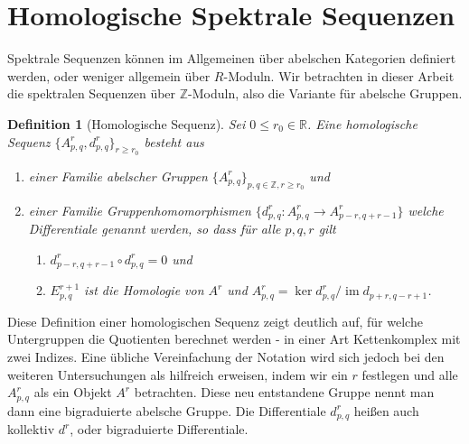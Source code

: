 \documentclass[12pt, hidelinks]{article}
\numberwithin{conj}{section}
\newtheorem{definition}[conj]{Definition}
\newcommand{\Z}{\mathbb{Z}}
\newcommand{\ima}{\operatorname{im}}
\begin{document}
\begin{Large}
\tableofcontents
\end{Large}

\section{Homologische Spektrale Sequenzen}
Spektrale Sequenzen können im Allgemeinen über abelschen Kategorien definiert werden, oder weniger allgemein über $R$-Moduln. Wir betrachten in dieser Arbeit die spektralen Sequenzen über $\mathbb{Z}$-Moduln, also die Variante für abelsche Gruppen.

\begin{definition}[Homologische Sequenz]
\label{homologischeSequenz}
Sei $0 \leq r_0 \in \mathbb{R}$. Eine homologische Sequenz $\{A^r_{p,q}, d^r_{p,q}\}_{r \geq r_0}$ besteht aus
\begin{enumerate}[nolistsep]
    \item einer Familie abelscher Gruppen $\{A^r_{p,q}\}_{p,q \in \Z, r \geq r_0}$ und
    \item einer Familie Gruppenhomomorphismen $\{d^r_{p,q}: A^r_{p,q} \to A^r_{p-r,q+r-1}\}$ welche Differentiale genannt werden, so dass für alle $p,q,r$ gilt
    \begin{enumerate}[nolistsep]
        \item $d^r_{p-r,q+r-1} \circ d^r_{p,q} = 0$ und
        \item $E^{r+1}_{p,q}$ ist die Homologie von $A^r$ und $A^r_{p,q} = \ker d^r_{p,q} / \ima d_{p+r,q-r+1}$.
    \end{enumerate}
\end{enumerate}
\end{definition}

Diese Definition einer homologischen Sequenz zeigt deutlich auf, für welche Untergruppen die Quotienten berechnet werden - in einer Art Kettenkomplex mit zwei Indizes. Eine übliche Vereinfachung der Notation wird sich jedoch bei den weiteren Untersuchungen als hilfreich erweisen, indem wir ein $r$ festlegen und alle $A^r_{p,q}$ als ein Objekt $A^r$ betrachten. Diese neu entstandene Gruppe nennt man dann eine bigraduierte abelsche Gruppe. Die Differentiale $d^r_{p,q}$ heißen auch kollektiv $d^r$, oder bigraduierte Differentiale.
\end{document}
